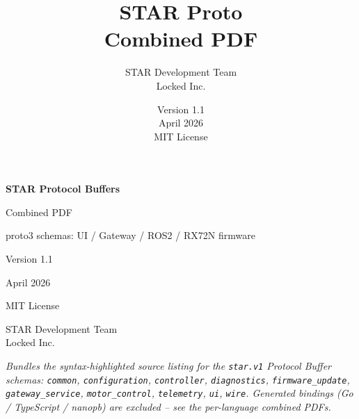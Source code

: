 \documentclass[11pt,letterpaper]{article}
\title{\Huge\bfseries STAR Proto\\[0.4em]\Large Combined PDF}
\author{STAR Development Team \\ Locked Inc.}
\date{Version 1.1 \\ April 2026 \\ MIT License}
\begin{document}
\begin{titlepage}
\centering
\vspace*{2.5cm}

{\Huge\bfseries STAR Protocol Buffers\par}
\vspace{0.3cm}
{\LARGE Combined PDF\par}
\vspace{0.3cm}
{\large proto3 schemas: UI / Gateway / ROS2 / RX72N firmware\par}

\vfill

{\large Version 1.1\par}
{\large April 2026\par}
\vspace{0.4cm}
{\large MIT License\par}

\vfill

{\normalsize STAR Development Team\\Locked Inc.\par}
\vspace{0.8cm}

{\small\itshape Bundles the syntax-highlighted source listing for the
\texttt{star.v1} Protocol Buffer schemas: \texttt{common},
\texttt{configuration}, \texttt{controller}, \texttt{diagnostics},
\texttt{firmware\_update}, \texttt{gateway\_service},
\texttt{motor\_control}, \texttt{telemetry}, \texttt{ui},
\texttt{wire}. Generated bindings (Go / TypeScript / nanopb) are
excluded -- see the per-language combined PDFs.\par}
\end{titlepage}

\tableofcontents
\newpage


\end{document}
